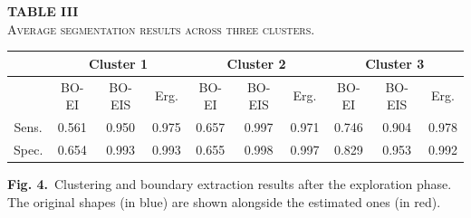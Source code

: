 \documentclass[11pt]{article}
\begin{document}
\vspace{0.6em}

\begin{center}
\textbf{TABLE III}\\[2pt]
\textsc{Average segmentation results across three clusters.}
\end{center}

\begin{center}
\footnotesize
\begin{tabular}{|c|ccc|ccc|ccc|}
\hline
 & \multicolumn{3}{c|}{Cluster 1}
 & \multicolumn{3}{c|}{Cluster 2}
 & \multicolumn{3}{c|}{Cluster 3} \\
\hline
 & BO-EI & BO-EIS & Erg. & BO-EI & BO-EIS & Erg. & BO-EI & BO-EIS & Erg. \\
\hline
Sens. & 0.561 & 0.950 & 0.975 & 0.657 & 0.997 & 0.971 & 0.746 & 0.904 & 0.978 \\
Spec. & 0.654 & 0.993 & 0.993 & 0.655 & 0.998 & 0.997 & 0.829 & 0.953 & 0.992 \\
\hline
\end{tabular}
\end{center}

\vspace{0.8em}

\begin{center}
\end{center}

\vspace{0.4em}

\textbf{Fig. 4.}\ Clustering and boundary extraction results after
the exploration phase. The original shapes (in blue) are shown
alongside the estimated ones (in red).

\vspace{0.8em}
\end{document}
